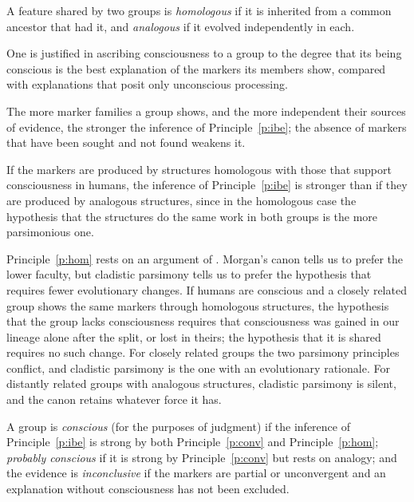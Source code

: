 \documentclass{situationist-preprint}
\begin{document}
\begin{definition}\label{d:hom}
A feature shared by two groups is \emph{homologous} if it is inherited from a common ancestor that had it, and \emph{analogous} if it evolved independently in each.
\end{definition}

\begin{principle}\label{p:ibe}
One is justified in ascribing consciousness to a group to the degree that its being conscious is the best explanation of the markers its members show, compared with explanations that posit only unconscious processing.
\end{principle}

\begin{principle}[Convergence]\label{p:conv}
The more marker families a group shows, and the more independent their sources of evidence, the stronger the inference of Principle~\ref{p:ibe}; the absence of markers that have been sought and not found weakens it.
\end{principle}

\begin{principle}[Homology]\label{p:hom}
If the markers are produced by structures homologous with those that support consciousness in humans, the inference of Principle~\ref{p:ibe} is stronger than if they are produced by analogous structures, since in the homologous case the hypothesis that the structures do the same work in both groups is the more parsimonious one.
\end{principle}

Principle~\ref{p:hom} rests on an argument of \citet{Sober2005}. Morgan's canon tells us to prefer the lower faculty, but cladistic parsimony tells us to prefer the hypothesis that requires fewer evolutionary changes. If humans are conscious and a closely related group shows the same markers through homologous structures, the hypothesis that the group lacks consciousness requires that consciousness was gained in our lineage alone after the split, or lost in theirs; the hypothesis that it is shared requires no such change. For closely related groups the two parsimony principles conflict, and cladistic parsimony is the one with an evolutionary rationale. For distantly related groups with analogous structures, cladistic parsimony is silent, and the canon retains whatever force it has.

\begin{definition}\label{d:verdict}
A group is \emph{conscious} (for the purposes of judgment) if the inference of Principle~\ref{p:ibe} is strong by both Principle~\ref{p:conv} and Principle~\ref{p:hom}; \emph{probably conscious} if it is strong by Principle~\ref{p:conv} but rests on analogy; and the evidence is \emph{inconclusive} if the markers are partial or unconvergent and an explanation without consciousness has not been excluded.
\end{definition}
\end{document}
